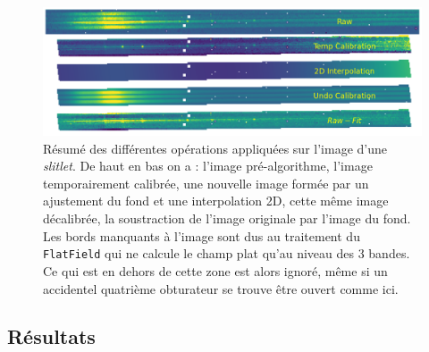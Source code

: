 \documentclass[12pt, a4paper]{article}
\begin{document}
\begin{figure}[H]
  \centering
  \includegraphics[scale=0.5]{assets/background_subtraction.png}
  \caption{Résumé des différentes opérations appliquées sur l'image d'une \textit{slitlet}. De haut en bas on a : l'image pré-algorithme, l'image temporairement calibrée, une nouvelle image formée par un ajustement du fond et une interpolation 2D, cette même image décalibrée, la soustraction de l'image originale par l'image du fond. Les bords manquants à l'image sont dus au traitement du \texttt{FlatField} qui ne calcule le champ plat qu'au niveau des 3 bandes. Ce qui est en dehors de cette zone est alors ignoré, même si un accidentel quatrième obturateur se trouve être ouvert comme ici.}
  \label{fig:background}
\end{figure}

\subsection{Résultats}
\end{document}
